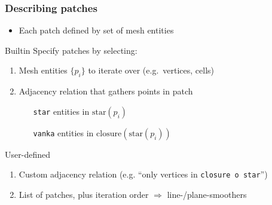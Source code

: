 \documentclass[presentation,aspectratio=43, 10pt]{beamer}
\newcommand{\convexpath}[2]{
  [
  create hullcoords/.code={
    \global\edef\namelist{#1}
    \foreach [count=\counter] \nodename in \namelist {
      \global\edef\numberofnodes{\counter}
      \coordinate (hullcoord\counter) at (\nodename);
    }
    \coordinate (hullcoord0) at (hullcoord\numberofnodes);
    \pgfmathtruncatemacro\lastnumber{\numberofnodes+1}
    \coordinate (hullcoord\lastnumber) at (hullcoord1);
  },
  create hullcoords
  ]
  ($(hullcoord1)!#2!-90:(hullcoord0)$)
  \foreach [
  evaluate=\currentnode as \previousnode using \currentnode-1,
  evaluate=\currentnode as \nextnode using \currentnode+1
  ] \currentnode in {1,...,\numberofnodes} {
    let \p1 = ($(hullcoord\currentnode) - (hullcoord\previousnode)$),
    \n1 = {atan2(\y1,\x1) + 90},
    \p2 = ($(hullcoord\nextnode) - (hullcoord\currentnode)$),
    \n2 = {atan2(\y2,\x2) + 90},
    \n{delta} = {Mod(\n2-\n1,360) - 360}
    in
    {arc [start angle=\n1, delta angle=\n{delta}, radius=#2]}
    -- ($(hullcoord\nextnode)!#2!-90:(hullcoord\currentnode)$)
  }
}
\begin{document}
\begin{frame}
\begin{overlayarea}{\textwidth}{0.6\textheight}
\begin{uncoverenv}
\begin{center}

    \end{center}
    \end{uncoverenv}
  \end{overlayarea}
\end{frame}
\begin{frame}[fragile]
 \frametitle{Describing patches}
 \begin{itemize}
 \item Each patch defined by set of mesh entities
 \end{itemize}
 \begin{block}{Builtin}
   Specify patches by selecting:
   \begin{enumerate}
   \item Mesh entities $\{p_i\}$ to iterate over (e.g.~vertices, cells)
   \item Adjacency relation that gathers points in patch
     \begin{itemize}
     \item[\texttt{star}] entities in $\text{star}(p_i)$
     \item[\texttt{vanka}] entities in $\text{closure}(\text{star}(p_i))$
     \end{itemize}
   \end{enumerate}
 \end{block}
 \begin{block}{User-defined}
   \begin{enumerate}
   \item Custom adjacency relation (e.g. ``only vertices in
     \texttt{closure o star}'')
   \item List of patches, plus iteration order $\Rightarrow$ line-/plane-smoothers
   \end{enumerate}
 \end{block}
\end{frame}
\end{document}
